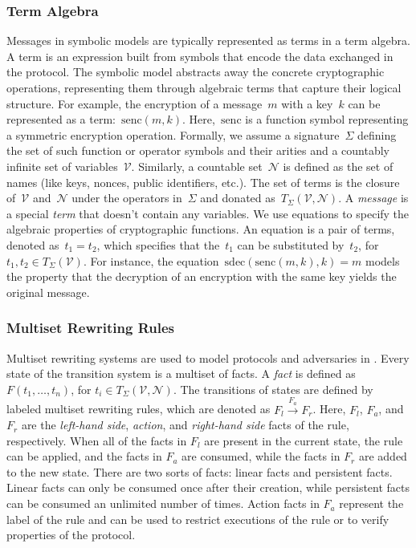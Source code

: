 \documentclass[../main.tex]{subfiles}
\begin{document}
\subsubsection{Term Algebra}
Messages in symbolic models are typically represented as terms in a term algebra. 
A term is an expression built from symbols that encode the data exchanged in the protocol. 
The symbolic model abstracts away the concrete cryptographic operations, representing them through algebraic terms that capture their logical structure.
For example, the encryption of a message~$m$ with a key~$k$ can be represented as a term:~$\text{senc}(m, k)$. 
Here,~$\text{senc}$ is a function symbol representing a symmetric encryption operation.
Formally, we assume a signature~$\Sigma$ defining the set of such function or operator symbols and their arities and a countably infinite set of variables~$\mathcal{V}$. 
Similarly, a countable set~$\mathcal{N}$ is defined as the set of names (like keys, nonces, public identifiers, etc.). 
The set of terms is the closure of~$\mathcal{V}$ and~$\mathcal{N}$ under the operators in~$\Sigma$ and donated as~$T_\Sigma(\mathcal{V}, \mathcal{N})$.
A \emph{message} is a special \emph{term} that doesn't contain any variables.
We use equations to specify the algebraic properties of cryptographic functions.
An equation is a pair of terms, denoted as~$t_1 = t_2$, which specifies that the~$t_1$ can be substituted by~$t_2$, for~$t_1,t_2 \in T_\Sigma(\mathcal{V})$.
For instance, the equation~$\text{sdec}(\text{senc}(m, k), k) = m$ models the property that the decryption of an encryption with the same key yields the original message.

\subsubsection{Multiset Rewriting Rules}
Multiset rewriting systems are used to model protocols and adversaries in \Tamarin{}. 
Every state of the transition system is a multiset of facts. 
A \emph{fact} is defined as $F(t_1, \ldots, t_n)$, for $t_i \in T_\Sigma(\mathcal{V}, \mathcal{N})$.
The transitions of states are defined by labeled multiset rewriting rules, which are denoted as $F_l \xrightarrow{F_a} F_r$.
Here, $F_l$, $F_a$, and $F_r$ are the \emph{left-hand side}, \emph{action}, and \emph{right-hand side} facts of the rule, respectively.
When all of the facts in $F_l$ are present in the current state, the rule can be applied, and the facts in $F_a$ are consumed, while the facts in $F_r$ are added to the new state.
There are two sorts of facts: linear facts and persistent facts.
Linear facts can only be consumed once after their creation, while persistent facts can be consumed an unlimited number of times.
Action facts in $F_a$ represent the label of the rule and can be used to restrict executions of the rule or to verify properties of the protocol.
\end{document}

